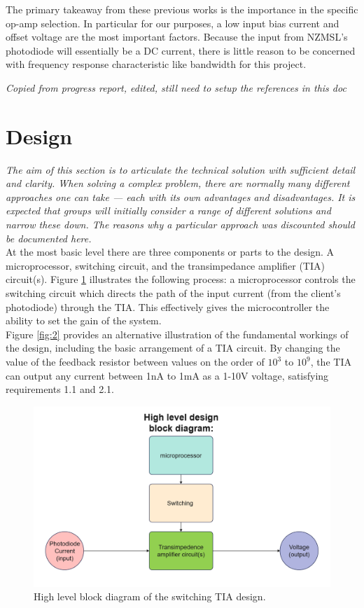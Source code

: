 \documentclass[conference]{IEEEtran}
\begin{document}
The primary takeaway from these previous works is the importance in the specific op-amp selection. In particular for our purposes, a low input bias current and offset voltage are the most important factors. Because the input from NZMSL's photodiode will essentially be a DC current, there is little reason to be concerned with frequency response characteristic like bandwidth for this project. 

\textit{Copied from progress report, edited, still need to setup the references in this doc}

\section{Design}

\textit{The aim of this section is to articulate the technical solution with sufficient detail and clarity. When solving a complex problem, there are normally many different approaches one can take — each with its own advantages and disadvantages. It is expected that groups will initially consider a range of different solutions and narrow these down. The reasons why a particular approach was discounted should be documented here.} \\

At the most basic level there are three components or parts to the design. A microprocessor, switching circuit, and the transimpedance amplifier (TIA) circuit(s). Figure \ref{fig:1} illustrates the following process: a microprocessor controls the switching circuit which directs the path of the input current (from the client’s photodiode) through the TIA. This effectively gives the microcontroller the ability to set the gain of the system. \\

Figure \ref{fig:2} provides an alternative illustration of the fundamental workings of the design, including the basic arrangement of a TIA circuit. By changing the value of the feedback resistor between values on the order of $10^3$ to $10^9$, the TIA can output any current between 1nA to 1mA as a 1-10V voltage, satisfying requirements 1.1 and 2.1.

\begin{figure}
    \centering
    \includegraphics[width=0.8\linewidth]{ENGR302_TIA_blockl_diagram_v2.png}
    \caption{High level block diagram of the switching TIA design.}
    \label{fig:1}
\end{figure}
\end{document}
